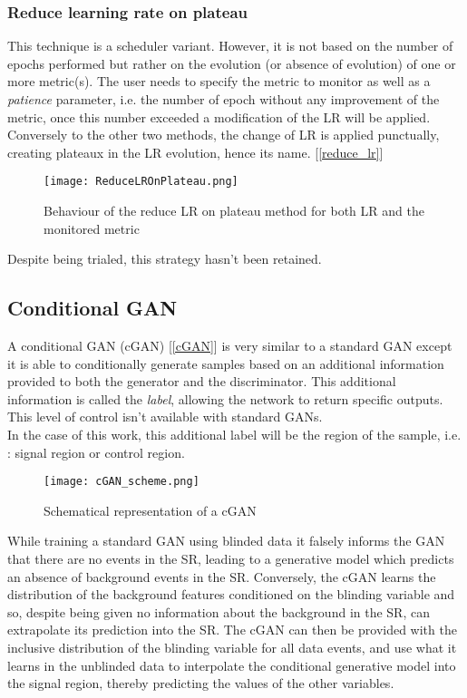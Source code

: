 \documentclass [12pt] {article}
\numberwithin{equation}{section} %
\numberwithin{figure}{section}   %
\begin{document}
\subsubsection{Reduce learning rate on plateau}

This technique is a scheduler variant. However, it is not based on the number of epochs performed but rather on the evolution (or absence of evolution) of one or more metric(s). The user needs to specify the metric to monitor as well as a \textit{patience} parameter, i.e. the number of epoch without any improvement of the metric, once this number exceeded a modification of the LR will be applied. Conversely to the other two methods, the change of LR is applied punctually, creating plateaux in the LR evolution, hence its name. [\ref{reduce_lr}]

\begin{figure}[H]
    \centering
    \texttt{[image: ReduceLROnPlateau.png]}
    \caption{Behaviour of the reduce LR on plateau method for both LR and the monitored metric}
    \label{fig:enter-label}
\end{figure}
Despite being trialed, this strategy hasn't been retained.


\subsection{Conditional GAN}

A conditional GAN (cGAN) [\ref{cGAN}] is very similar to a standard GAN except it is able to conditionally generate samples based on an additional information provided to both the generator and the discriminator. This additional information is called the \textit{label}, allowing the network to return specific outputs. This level of control isn't available with standard GANs.\\
In the case of this work, this additional label will be the region of the sample, i.e. : signal region or control region.\\

\begin{figure}[H]
    \centering
    \texttt{[image: cGAN\_scheme.png]}
    \caption{Schematical representation of a cGAN}
\end{figure}

While training a standard GAN using blinded data it falsely informs the GAN that there are no events in the SR, leading to a generative model which predicts an absence of background events in the SR. Conversely, the cGAN learns the distribution of the background features conditioned on the blinding variable and so, despite being given no information about the background in the SR, can extrapolate its prediction into the SR. The cGAN can then be provided with the inclusive distribution of the blinding variable for all data events, and use what it learns in the unblinded data to interpolate the conditional generative model into the signal region, thereby predicting the values of the other variables.
\end{document}
